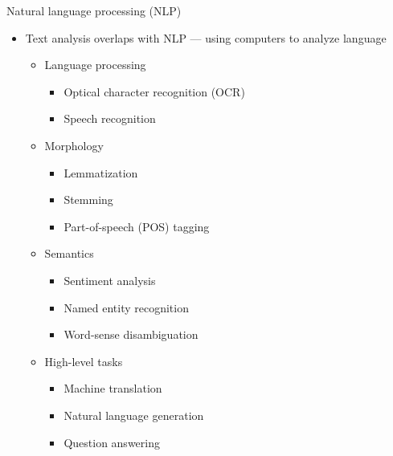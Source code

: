 \documentclass[pdf, 9pt, fleqn, handout]{beamer}
\begin{document}
\begin{frame}{Natural language processing (NLP)}
\begin{itemize}
\item Text analysis overlaps with NLP — using computers to analyze language \\[0.5em]
\begin{itemize}
\item Language processing \\[0.5em]
\begin{itemize}
\item Optical character recognition (OCR) \\[0.5em]
\item Speech recognition \\[0.5em]
\end{itemize}
\item Morphology \\[0.5em]
\begin{itemize}
\item Lemmatization \\[0.5em]
\item Stemming \\[0.5em]
\item Part-of-speech (POS) tagging \\[0.5em]
\end{itemize}
\item Semantics \\[0.5em]
\begin{itemize}
\item Sentiment analysis \\[0.5em]
\item Named entity recognition \\[0.5em]
\item Word-sense disambiguation \\[0.5em]
\end{itemize}
\item High-level tasks \\[0.5em]
\begin{itemize}
\item Machine translation \\[0.5em]
\item Natural language generation \\[0.5em]
\item Question answering 
\end{itemize}
\end{itemize}
\end{itemize}
\end{frame}
\end{document}
